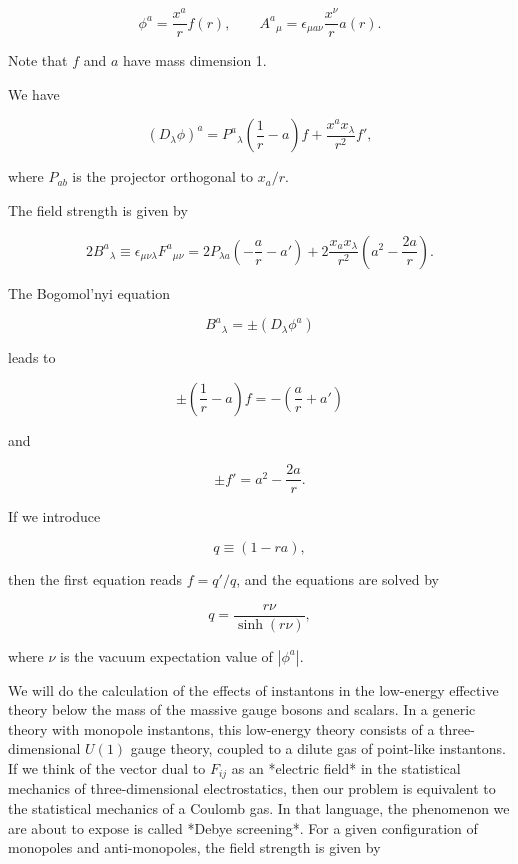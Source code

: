 \[
  \phi^a=\frac{x^a}{r}f(r),
  \qquad
  A^a{}_{\mu}=\epsilon_{\mu a\nu}\frac{x^\nu}{r}a(r).
\]

Note that $f$ and $a$ have mass dimension 1.

We have

\[
  (D_\lambda\phi)^a=P^a{}_{\lambda}
  \left(\frac1r-a\right)f+\frac{x^ax_\lambda}{r^2}f',
\]

where $P_{ab}$ is the projector orthogonal to $x_a/r$.

The field strength is given by

\[
  2B^a{}_\lambda\equiv\epsilon_{\mu\nu\lambda}F^a{}_{\mu\nu}
  =2P_{\lambda a}\left(-\frac a r-a'\right)
  +2\frac{x_ax_\lambda}{r^2}
  \left(a^2-\frac{2a}{r}\right).
\]

The Bogomol'nyi equation

\[
  B^a{}_{\lambda}=\pm(D_\lambda\phi^a)
\]

leads to

\[
  \pm\left(\frac1r-a\right)f=-\left(\frac a r+a'\right)
\]

and

\[
  \pm f'=a^2-\frac{2a}{r}.
\]

If we introduce

\[
  q\equiv(1-ra),
\]

then the first equation reads $f=q'/q$, and the equations are solved by

\[
  q=\frac{r\nu}{\sinh(r\nu)},
\]

where $\nu$ is the vacuum expectation value of $|\phi^a|$.

We will do the calculation of the effects of instantons in the low-energy
effective theory below the mass of the massive gauge bosons and scalars. In a
generic theory with monopole instantons, this low-energy theory consists of a
three-dimensional $U(1)$ gauge theory, coupled to a dilute gas of point-like
instantons. If we think of the vector dual to $F_{ij}$ as an *electric field* in
the statistical mechanics of three-dimensional electrostatics, then our problem
is equivalent to the statistical mechanics of a Coulomb gas. In that language,
the phenomenon we are about to expose is called *Debye screening*. For a given
configuration of monopoles and anti-monopoles, the field strength is given by

